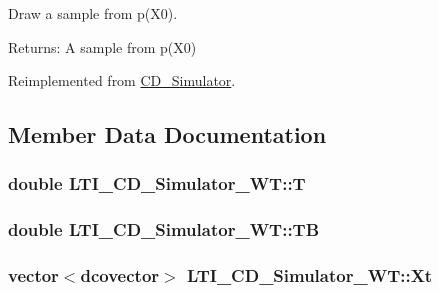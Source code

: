 Draw a sample from p(X0). 

\begin{Desc}
\item[Returns:]A sample from p(X0) \end{Desc}


Reimplemented from \hyperlink{class_c_d___simulator_cbdbea3e487026be0c032d2218d27b2b}{CD\_\-Simulator}.

\subsection{Member Data Documentation}
\hypertarget{class_l_t_i___c_d___simulator___w_t_5ceaf9896225588b2aff938b13e86996}{
\subsubsection[{T}]{\setlength{\rightskip}{0pt plus 5cm}double {\bf LTI\_\-CD\_\-Simulator\_\-WT::T}}}
\label{class_l_t_i___c_d___simulator___w_t_5ceaf9896225588b2aff938b13e86996}


\hypertarget{class_l_t_i___c_d___simulator___w_t_f03a9456dc6940c1c3f772336d911c3e}{
\subsubsection[{TB}]{\setlength{\rightskip}{0pt plus 5cm}double {\bf LTI\_\-CD\_\-Simulator\_\-WT::TB}}}
\label{class_l_t_i___c_d___simulator___w_t_f03a9456dc6940c1c3f772336d911c3e}


\hypertarget{class_l_t_i___c_d___simulator___w_t_97dfbe7f66cefff7b32d3288aece9964}{
\subsubsection[{Xt}]{\setlength{\rightskip}{0pt plus 5cm}vector$<$dcovector$>$ {\bf LTI\_\-CD\_\-Simulator\_\-WT::Xt}}}
\label{class_l_t_i___c_d___simulator___w_t_97dfbe7f66cefff7b32d3288aece9964}


